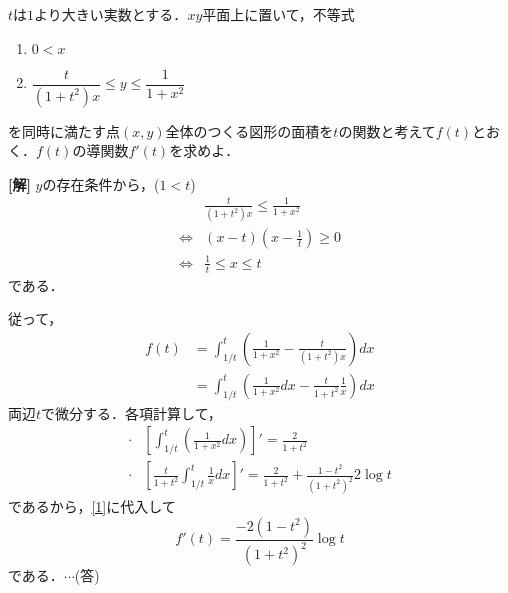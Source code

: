 \documentclass[a4j]{jarticle}
\begin{document}

     \begin{oframed}
     $t$は$1$より大きい実数とする．$xy$平面上に置いて，不等式
         \begin{enumerate}[(1)]
         \item $0<x$
         \item $\dfrac{t}{(1+t^2)x}\le y\le\dfrac{1}{1+x^2}$
         \end{enumerate}
    を同時に満たす点$(x,y)$全体のつくる図形の面積を$t$の関数と考えて$f(t)$とおく．$f(t)$の導関数$f'(t)$を求めよ．
     \end{oframed}

\setlength{\columnseprule}{0.4pt}
\begin{multicols}{2}
{\bf[解]} $y$の存在条件から，($1<t$)
     \begin{align*}
      &\frac{t}{(1+t^2)x}\le\frac{1}{1+x^2}　\\
       \Longleftrightarrow &(x-t)\left(x-\frac{1}{t}\right)\ge0 \\ 
       \Longleftrightarrow &\frac{1}{t}\le x\le t
     \end{align*}
である．

従って，
     \begin{align}
     f(t)&=\int_{1/t}^t\left(\frac{1}{1+x^2}-\frac{t}{(1+t^2)x}\right)dx \nonumber\\
     &=\int_{1/t}^t\left(\frac{1}{1+x^2}dx-\frac{t}{1+t^2}\frac{1}{x}\right)dx\label{1}
     \end{align}
両辺$t$で微分する．各項計算して，
     \begin{align*}
      \cdot&\left[\int_{1/t}^t\left(\frac{1}{1+x^2}dx\right)\right]'=\frac{2}{1+t^2} \\
     \cdot&\left[\frac{t}{1+t^2}\int_{1/t}^t\frac{1}{x}dx\right]'=\frac{2}{1+t^2}+\frac{1-t^2}{(1+t^2)^2}2\log t
     \end{align*}
であるから，\eqref{1}に代入して
     \[f'(t)=\frac{-2(1-t^2)}{(1+t^2)^2}\log t\]
である．$\cdots$(答)   
\newpage
\end{multicols}
\end{document}
